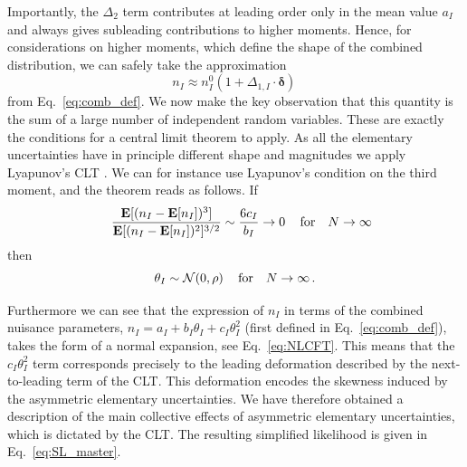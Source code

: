 \documentclass[11pt]{article}
\newcommand{\be}{\begin{equation}}
\newcommand{\ee}{\end{equation}}
\begin{document}
Importantly,    the $\Delta_2$ term contributes at leading order only in the mean value
$a_I$
 and always gives subleading contributions to higher moments.
 Hence, for considerations on higher moments, which define the  shape of the combined distribution, we can safely take the approximation
\be
n_{I}\approx n^{0}_{I}\left(1+ \Delta_{1,I}\cdot \boldsymbol{\delta}\right)\, \label{eq:n_approx}
\ee
from Eq.~\eqref{eq:comb_def}.
We now make  the key observation that this quantity is the sum of a large number of independent random variables. These are exactly the conditions for a central limit theorem to apply.
As all the elementary uncertainties have in principle different shape and magnitudes we apply Lyapunov's CLT \cite{Billingsley}. We can for instance use Lyapunov's condition on the third moment, and the theorem reads as follows. If 
\be
\quad\frac{{\bf E}[(n_I-{\bf E}[n_I])^3]}{{\bf E}[(n_I-{\bf E}[n_I])^2]^{3/2}}\sim\frac{6 c_I}{b_I}\rightarrow 0 \quad \,\textrm{for} \quad N\rightarrow \infty
\ee
then
\be
\theta_I\sim {\cal N }(0,\rho) \quad \,\textrm{for} \quad N\rightarrow \infty \,.
\ee

Furthermore we can see that the expression of $n_I$ in terms of the combined nuisance parameters, $n_I=a_I+b_{I}\theta_I+ c_I\theta_I^2$ (first defined in Eq.~\eqref{eq:comb_def}), takes the form of a normal expansion, %
see Eq.~\eqref{eq:NLCFT}. 
This means that the $c_I \theta_I^2$ term  corresponds  precisely to the leading deformation  described by the next-to-leading term of the CLT.  This deformation encodes the skewness induced by the asymmetric elementary uncertainties. We have therefore obtained  a  description of the main collective effects of asymmetric elementary uncertainties, which is dictated by  the CLT. The resulting  simplified likelihood is given in Eq.~\eqref{eq:SL_master}.


%

\end{document}
